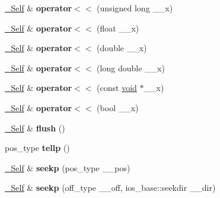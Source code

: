 \begin{DoxyCompactItemize}
\item 
\mbox{\label{classbasic__ostream_ade72e5c359b331be99dd77959a4a76c3}} 
\hyperlink{classbasic__ostream}{\+\_\+\+Self} \& {\bfseries operator$<$$<$} (unsigned long \+\_\+\+\_\+x)
\item 
\mbox{\label{classbasic__ostream_a867439603ecbc8c2b25a82be3c37fed3}} 
\hyperlink{classbasic__ostream}{\+\_\+\+Self} \& {\bfseries operator$<$$<$} (float \+\_\+\+\_\+x)
\item 
\mbox{\label{classbasic__ostream_aa59ac17ff93bb9b379caf937d011bfd4}} 
\hyperlink{classbasic__ostream}{\+\_\+\+Self} \& {\bfseries operator$<$$<$} (double \+\_\+\+\_\+x)
\item 
\mbox{\label{classbasic__ostream_a392f62682fe6f3e34371c337f8405bb6}} 
\hyperlink{classbasic__ostream}{\+\_\+\+Self} \& {\bfseries operator$<$$<$} (long double \+\_\+\+\_\+x)
\item 
\mbox{\label{classbasic__ostream_a03ebaf74d2e005e6c829fd8ac5531b7a}} 
\hyperlink{classbasic__ostream}{\+\_\+\+Self} \& {\bfseries operator$<$$<$} (const \hyperlink{interfacevoid}{void} $\ast$\+\_\+\+\_\+x)
\item 
\mbox{\label{classbasic__ostream_a91f254683be4a16a81bf41af0e16ccaf}} 
\hyperlink{classbasic__ostream}{\+\_\+\+Self} \& {\bfseries operator$<$$<$} (bool \+\_\+\+\_\+x)
\item 
\mbox{\label{classbasic__ostream_a0612fc5f0f34bfada501cc754e6733d3}} 
\hyperlink{classbasic__ostream}{\+\_\+\+Self} \& {\bfseries flush} ()
\item 
\mbox{\label{classbasic__ostream_aa4380cba871ec51b003dafa6e7a67d6c}} 
pos\+\_\+type {\bfseries tellp} ()
\item 
\mbox{\label{classbasic__ostream_aabbb864d77714eee7b8f0b4cde4bc9ad}} 
\hyperlink{classbasic__ostream}{\+\_\+\+Self} \& {\bfseries seekp} (pos\+\_\+type \+\_\+\+\_\+pos)
\item 
\mbox{\label{classbasic__ostream_ae61689de705e730f3088d136a3b32251}} 
\hyperlink{classbasic__ostream}{\+\_\+\+Self} \& {\bfseries seekp} (off\+\_\+type \+\_\+\+\_\+off, ios\+\_\+base\+::seekdir \+\_\+\+\_\+dir)
\end{DoxyCompactItemize}
